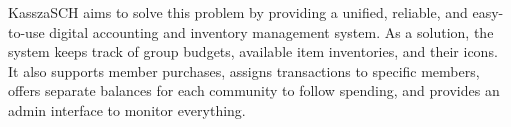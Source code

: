 KasszaSCH aims to solve this problem by providing a unified, reliable, and easy-to-use digital accounting and inventory management system. As a solution, the system keeps track of group budgets, available item inventories, and their icons. It also supports member purchases, assigns transactions to specific members, offers separate balances for each community to follow spending, and provides an admin interface to monitor everything.


\vfill
\selectthesislanguage

